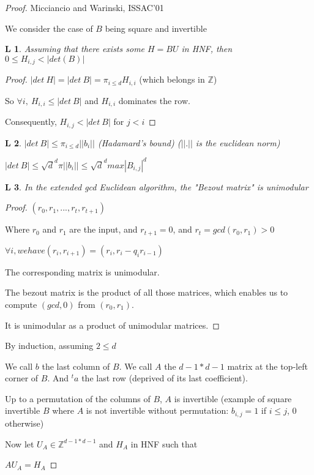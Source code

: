 \documentclass[11pt]{article}
\newtheorem{lemm}{L}
\begin{document}
\begin{proof}
Micciancio and Warinski, ISSAC'01

We consider the case of $B$ being square and invertible
\begin{lemm}
Assuming that there exists some $H= B U$ in HNF, then $0 \leq H_{i,j} < |det(B)|$
\end{lemm}
\begin{proof}
$|det \ H|=|det \ B|=\pi_{i \leq d} H_{i,i}$ (which belongs in $\mathbb{Z}$)

So $\forall i, \ H_{i,i} \leq |det \ B| $ and $H_{i,i}$ dominates the row.

Consequently, $H_{i,j} < |det \ B|$ for $j < i$
\end{proof}

\begin{lemm}
$|det \ B| \leq \pi_{i \leq d} || b_i || $ (Hadamard's bound) ($||.||$ is the euclidean norm)
\end{lemm}
$|det \ B| \leq \sqrt{d}^{d} \pi || b_i || \leq \sqrt{d}^{d} max |B_{i,j}|^d$
\begin{lemm}
In the extended gcd Euclidean algorithm, the "Bezout matrix" is unimodular
\end{lemm}
\begin{proof}
$(r_0,r_1,...,r_t,r_{t+1})$

Where $r_0$ and $r_1$ are the input, and $r_{t+1}=0$, and $r_t=gcd(r_0,r_1)>0$

$\forall i, we have (r_i,r_{i+1})=(r_i,r_i-q_i r_{i-1})$

The corresponding matrix is unimodular.

The bezout matrix is the product of all those matrices, which enables us to compute $(gcd,0)$ from $(r_0,r_1)$.

It is unimodular as a product of unimodular matrices.
\end{proof}
By induction, assuming $2 \leq d$

We call $b$ the last column of $B$. We call $A$ the $d-1*d-1$ matrix at the top-left corner of $B$. And $^ta$ the last row (deprived of its last coefficient).

Up to a permutation of the columns of $B$, $A$ is invertible (example of square invertible $B$ where $A$ is not invertible without permutation: $b_{i,j}=1$ if $i \leq j$, $0$ otherwise)

Now let $U_A \in \mathbb{Z}^{d-1*d-1}$ and $H_A$ in HNF such that

$A U_A = H_A$


\end{proof}
\end{document}
